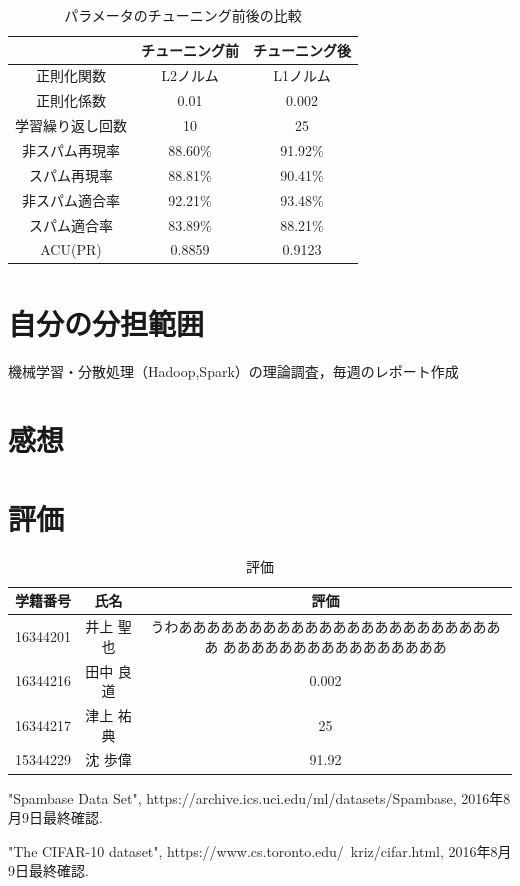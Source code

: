 \documentclass[a4paper,12pt]{jarticle}
\begin{document}
\begin{table}[hbt]
\centering
\caption{パラメータのチューニング前後の比較}
\label{tab:パラメータのチューニング前後の比較}
\fontsize{9pt}{10pt}\selectfont
\begin{tabular}{|c|c|c|} \hline
 &チューニング前&チューニング後 \\ \hline
正則化関数& L2ノルム & L1ノルム \\ \hline
正則化係数&0.01 & 0.002 \\ \hline
学習繰り返し回数  &10 & 25  \\ \hline \hline
非スパム再現率& 88.60\%& 91.92\% \\ \hline
スパム再現率& 88.81\%& 90.41\% \\ \hline
非スパム適合率& 92.21\%& 93.48\% \\ \hline
スパム適合率& 83.89\%& 88.21\% \\ \hline
ACU(PR)& 0.8859 &0.9123 \\ \hline
\end{tabular}
\end{table}

\section{自分の分担範囲}
機械学習・分散処理（Hadoop,Spark）の理論調査，毎週のレポート作成
\section{感想}

\section{評価}
\begin{table}[hbtp]
\centering
\caption{評価}
\label{tab:評価}
\fontsize{9pt}{10pt}\selectfont
\begin{tabular}{c|c||c} \hline
 学籍番号&氏名     &評価   \\ \hline \hline
16344201&井上 聖也& うわああああああああああああああああああああああああ
		 ああああああああああああああああ    \\ \hline
16344216&田中 良道& 0.002 \\ \hline
16344217&津上 祐典& 25    \\ \hline 
15344229&沈 歩偉　& 91.92 \\ \hline
\end{tabular}
\end{table}

\newpage
\begin{thebibliography}{99}

  "Spambase Data Set",
		 https://archive.ics.uci.edu/ml/datasets/Spambase, 2016年8月9日最終確認.

  "The CIFAR-10 dataset",
		 https://www.cs.toronto.edu/~kriz/cifar.html, 2016年8月9日最終確認.

\end{thebibliography}
\end{document}
